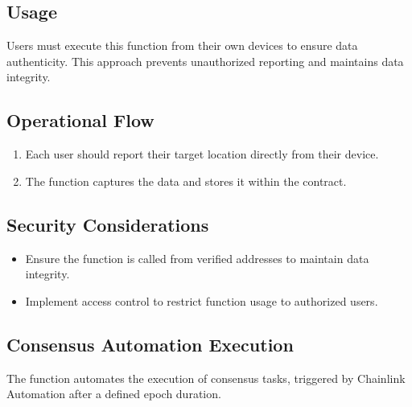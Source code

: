 \documentclass[letterpaper,10pt,english]{sphinxmanual}
\begin{document}
\subsection{Usage}
\label{\detokenize{docs_consensus_mechanism_contract:id2}}
\sphinxAtStartPar
Users must execute this function from their own devices to ensure data authenticity. This approach prevents unauthorized reporting and maintains data integrity.


\subsection{Operational Flow}
\label{\detokenize{docs_consensus_mechanism_contract:operational-flow}}\begin{enumerate}
%
\item {} 
\sphinxAtStartPar
{} Each user should report their target location directly from their device.

\item {} 
\sphinxAtStartPar
{} The function captures the  data and stores it within the contract.

\end{enumerate}


\subsection{Security Considerations}
\label{\detokenize{docs_consensus_mechanism_contract:id3}}\begin{itemize}
\item {} 
\sphinxAtStartPar
{} Ensure the function is called from verified addresses to maintain data integrity.

\item {} 
\sphinxAtStartPar
{} Implement access control to restrict function usage to authorized users.

\end{itemize}


\subsection{Consensus Automation Execution}
\label{\detokenize{docs_consensus_mechanism_contract:consensus-automation-execution}}
\sphinxAtStartPar
The  function automates the execution of consensus tasks, triggered by Chainlink Automation after a defined epoch duration.
\end{document}
